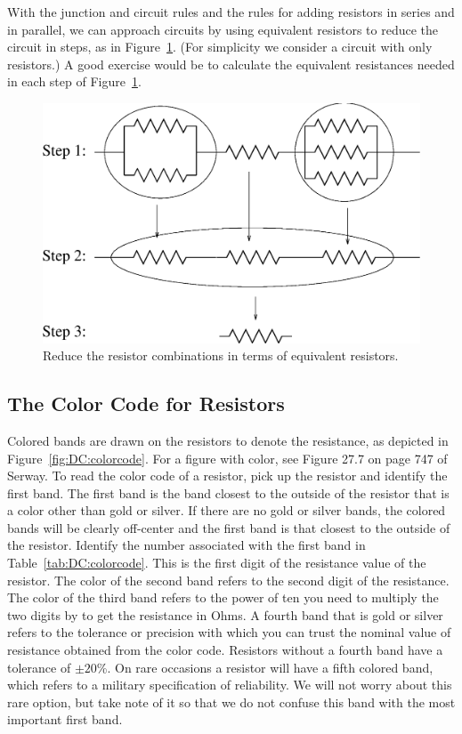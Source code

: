 With the junction and circuit rules and the rules for adding resistors in 
series and in parallel, we can approach circuits by using equivalent resistors 
to reduce the circuit in steps, as in Figure~\ref{fig:DC:resistreduce}. (For 
simplicity we consider a circuit with only resistors.)  
A good exercise would be to calculate the equivalent resistances needed in each
step of Figure~\ref{fig:DC:resistreduce}.  
\begin{figure}[htb]
\centering \epsfxsize=9cm \includegraphics[scale=0.6]{2_dc/resistreduce.eps}
\caption{Reduce the resistor combinations in terms of equivalent resistors.}
\label{fig:DC:resistreduce}
\end{figure}

\subsection{The Color Code for Resistors}

Colored bands are drawn on the resistors to denote the resistance, as 
depicted in Figure~\ref{fig:DC:colorcode}. 
For a figure with color, see Figure 27.7 on page 747 of Serway.
To read the color code of a resistor, pick up the resistor and identify the
first band. The first band is the band closest to the outside of the resistor 
that is a color other than gold or silver.  If there are no gold or silver 
bands, the colored bands will be clearly off-center and the first band is that 
closest to the outside of the resistor.  Identify the number associated
with the first band in Table~\ref{tab:DC:colorcode}. 
This is the first digit of the resistance value of the resistor.  The color of 
the second band refers to the second digit of the resistance. The color of the 
third band refers to the power of ten you need to multiply the two digits by 
to get the resistance in Ohms. A fourth band that is gold or silver refers to 
the tolerance or precision with which you can trust the nominal value of 
resistance obtained from the color code. Resistors without a fourth band have
a tolerance of $\pm 20$\%.  On rare occasions a resistor will have a fifth 
colored band, which refers to a military specification of reliability. We will 
not worry about this rare option, but take note of it so that we do not 
confuse this band with the most important first band. \\
\vfill

